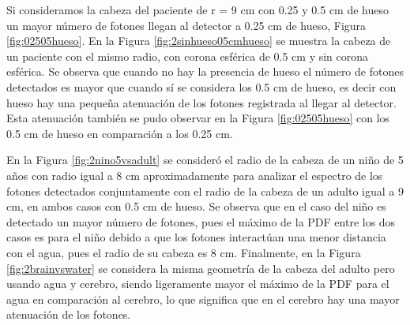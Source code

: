\documentclass[12pt,a4paper,onecolumn]{article}
\begin{document}
Si consideramos la cabeza del paciente de r = 9 cm con 0.25 y 0.5 cm de hueso un mayor número de fotones llegan al detector a 0.25 cm de hueso, Figura \ref{fig:02505hueso}. En la Figura \ref{fig:2sinhueso05cmhueso} se muestra la cabeza de un paciente con el mismo radio, con corona esférica de 0.5 cm y sin corona esférica. Se observa que cuando no hay la presencia de hueso el número de fotones detectados es mayor que cuando sí se considera los 0.5 cm de hueso, es decir con hueso hay una pequeña atenuación de los fotones registrada al llegar al detector. Esta atenuación también se pudo observar en la Figura \ref{fig:02505hueso} con los 0.5 cm de hueso en comparación a los 0.25 cm.

En la Figura \ref{fig:2nino5vsadult} se consideró el radio de la cabeza de un niño de 5 años con radio igual a 8 cm aproximadamente para analizar el espectro de los fotones detectados conjuntamente con el radio de la cabeza de un adulto igual a 9 cm, en ambos casos con 0.5 cm de hueso. Se observa que en el caso del niño es detectado un mayor número de fotones, pues el máximo de la PDF entre los dos casos es para el niño debido a que los fotones interactúan una menor distancia con el agua, pues el radio de su cabeza es 8 cm. Finalmente, en la Figura \ref{fig:2brainvswater} se considera la misma geometría de la cabeza del adulto pero usando agua y cerebro, siendo ligeramente mayor el máximo de la PDF para el agua en comparación al cerebro, lo que significa que en el cerebro hay una mayor atenuación de los fotones.
\end{document}
